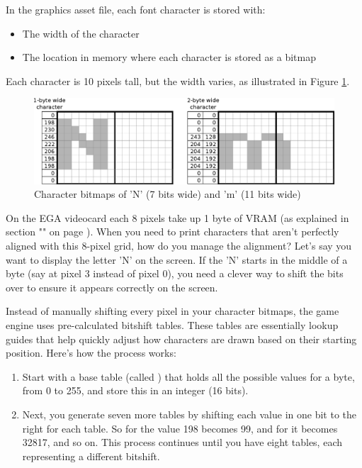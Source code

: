 \documentclass[book.tex]{subfiles}
\begin{document}
\par
In the graphics asset file, each font character is stored with:
\begin{itemize}
  \item The width of the character
  \item The location in memory where each character is stored as a bitmap
\end{itemize}
Each character is 10 pixels tall, but the width varies, as illustrated in Figure \ref{fig:text_bitmap}. 
\begin{figure}[H]
\centering
 \includegraphics[width=\textwidth]{imgs/drawings/text_bitmap.eps}
 \caption{Character bitmaps of 'N' (7 bits wide) and 'm' (11 bits wide)}
 \label{fig:text_bitmap}
 \end{figure}
 \par
 
On the EGA videocard each 8 pixels take up 1 byte of VRAM (as explained in section "" on page \pageref{section:EGA_Planar_Madness}). When you need to print characters that aren't perfectly aligned with this 8-pixel grid, how do you manage the alignment? Let's say you want to display the letter 'N' on the screen. If the 'N' starts in the middle of a byte (say at pixel 3 instead of pixel 0), you need a clever way to shift the bits over to ensure it appears correctly on the screen.\\

\par
Instead of manually shifting every pixel in your character bitmaps, the game engine uses pre-calculated bitshift tables. These tables are essentially lookup guides that help quickly adjust how characters are drawn based on their starting position. Here's how the process works:
\begin{enumerate}
  \item Start with a base table (called ) that holds all the possible values for a byte, from 0 to 255, and store this in an integer (16 bits). 
  \item Next, you generate seven more tables by shifting each value in  one bit to the right for each table. So for  the value 198 becomes 99, and for  it becomes 32817, and so on. This process continues until you have eight tables, each representing a different bitshift.
\end{enumerate}
\end{document}
